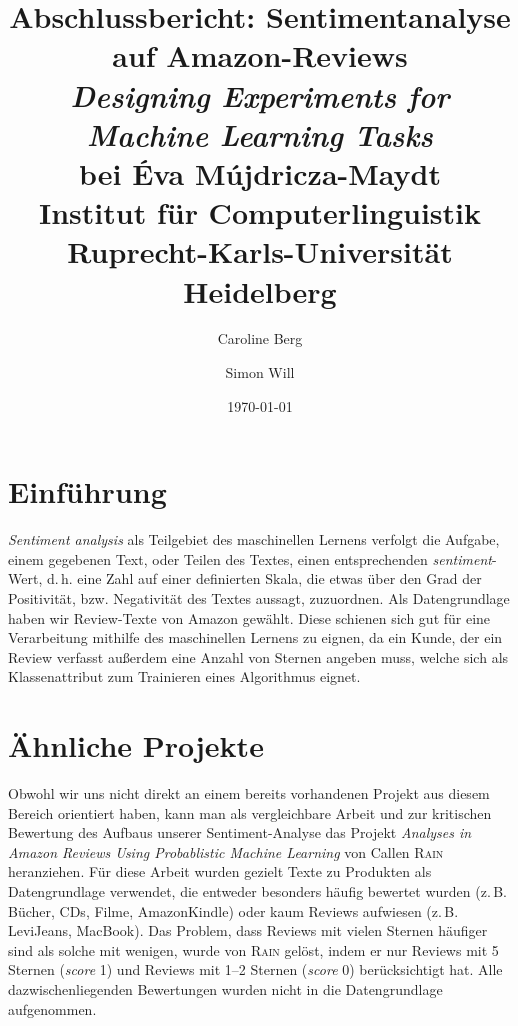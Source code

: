 \documentclass[a4paper]{article}
\title{Abschlussbericht: Sentimentanalyse auf Amazon-Reviews\\[0.5cm]
\large \textit{Designing Experiments for Machine Learning Tasks}\\[0.2cm]
\large bei Éva Mújdricza-Maydt\\[0.2cm]
\large Institut für Computerlinguistik\\[0.2cm]
\large Ruprecht-Karls-Universität Heidelberg\\}
\author{Caroline Berg \and Simon Will}
\date{\today}
\newcommand{\ourhighlight}[1]{\textit{#1}}
\begin{document}
\maketitle
\newpage


\tableofcontents
\newpage



\section{Einführung}

\ourhighlight{Sentiment analysis} als Teilgebiet des maschinellen Lernens verfolgt die Aufgabe, einem gegebenen Text, oder Teilen des Textes, einen entsprechenden \ourhighlight{sentiment}-Wert, d.\,h. eine Zahl auf einer definierten Skala, die etwas über den Grad der Positivität, bzw. Negativität des Textes aussagt, zuzuordnen.\newline
Als Datengrundlage haben wir Review-Texte von Amazon gewählt. Diese schienen sich gut für eine Verarbeitung mithilfe des maschinellen Lernens zu eignen, da ein Kunde, der ein Review verfasst außerdem eine Anzahl von Sternen angeben muss, welche sich als Klassenattribut zum Trainieren eines Algorithmus eignet. 


\section{Ähnliche Projekte}

Obwohl wir uns nicht direkt an einem bereits vorhandenen Projekt aus diesem Bereich orientiert haben, kann man als vergleichbare Arbeit und zur kritischen Bewertung des Aufbaus unserer Sentiment-Analyse das Projekt \emph{Analyses in Amazon Reviews Using Probablistic Machine Learning} von Callen \textsc{Rain} heranziehen. 
Für diese Arbeit wurden gezielt Texte zu Produkten als Datengrundlage verwendet, die entweder besonders häufig bewertet wurden (z.\,B. Bücher, CDs, Filme, AmazonKindle) oder kaum Reviews aufwiesen (z.\,B. LeviJeans, MacBook).
Das Problem, dass Reviews mit vielen Sternen häufiger sind als solche mit wenigen, wurde von \textsc{Rain} gelöst, indem er nur Reviews mit 5 Sternen (\emph{score} 1) und Reviews mit 1--2 Sternen (\emph{score} 0) berücksichtigt hat.
Alle dazwischenliegenden Bewertungen wurden nicht in die Datengrundlage aufgenommen.
\end{document}
